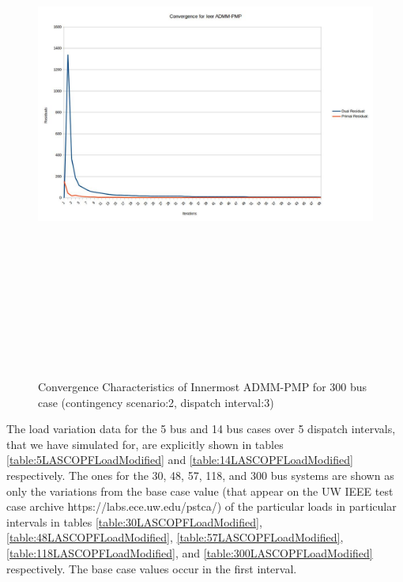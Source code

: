 \documentclass[preprint,12pt,3p]{elsarticle}
\begin{document}
\begin{figure}
\begin{center}
\includegraphics[height=17.5cm,width=21cm, angle=90]{300bus_2Scen_3Int.jpg} %
\caption{Convergence Characteristics of Innermost ADMM-PMP for 300 bus case (contingency scenario:2, dispatch interval:3)}
\label{ADMM-PMP300}
\end{center}
\end{figure}
The load variation data for the 5 bus and 14 bus cases over 5 dispatch intervals, that we have simulated for, are explicitly shown in tables \ref{table:5LASCOPFLoadModified} and \ref{table:14LASCOPFLoadModified} respectively. The ones for the 30, 48, 57, 118, and 300 bus systems are shown as only the variations from the base case value (that appear on the UW IEEE test case archive https://labs.ece.uw.edu/pstca/) of the particular loads in particular intervals in tables \ref{table:30LASCOPFLoadModified}, \ref{table:48LASCOPFLoadModified}, \ref{table:57LASCOPFLoadModified}, \ref{table:118LASCOPFLoadModified}, and \ref{table:300LASCOPFLoadModified} respectively. The base case values occur in the first interval.
\end{document}
